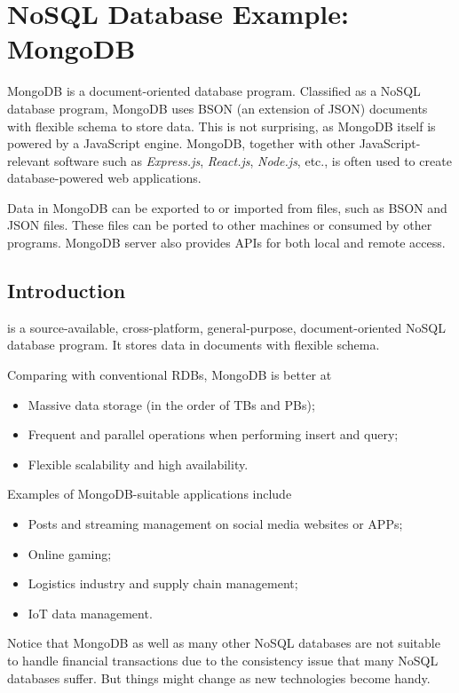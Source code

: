 \chapter{NoSQL Database Example: MongoDB}

MongoDB is a document-oriented database program. Classified as a NoSQL database program, MongoDB uses BSON (an extension of JSON) documents with flexible schema to store data. This is not surprising, as MongoDB itself is powered by a JavaScript engine. MongoDB, together with other JavaScript-relevant software such as \textit{Express.js}, \textit{React.js}, \textit{Node.js}, etc., is often used to create database-powered web applications.

Data in MongoDB can be exported to or imported from files, such as BSON and JSON files. These files can be ported to other machines or consumed by other programs. MongoDB server also provides APIs for both local and remote access. 

\section{Introduction}

 is a source-available, cross-platform, general-purpose, document-oriented NoSQL database program. It stores data in documents with flexible schema.

Comparing with conventional RDBs, MongoDB is better at
\begin{itemize}
	\item Massive data storage (in the order of TBs and PBs);
	\item Frequent and parallel operations when performing insert and query;
	\item Flexible scalability and high availability.
\end{itemize}

Examples of MongoDB-suitable applications include
\begin{itemize}
	\item Posts and streaming management on social media websites or APPs;
	\item Online gaming;
	\item Logistics industry and supply chain management;
	\item IoT data management.
\end{itemize}

Notice that MongoDB as well as many other NoSQL databases are not suitable to handle financial transactions due to the consistency issue that many NoSQL databases suffer. But things might change as new technologies become handy.

